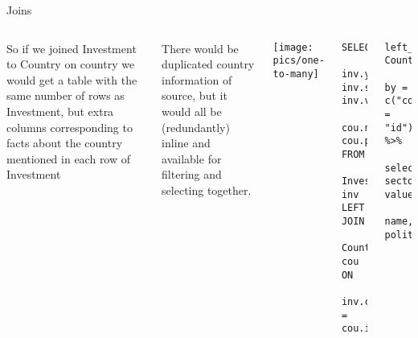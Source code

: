 \documentclass{hertieteaching}
\begin{document}
\begin{frame}[fragile]{Joins}

\begin{columns}[T,onlytextwidth]

So if we joined \textsf{Investment} to \textsf{Country} on \textsf{country} we would get a table with the same number of rows as \textsf{Investment}, but extra columns corresponding to facts about the country mentioned in each row of \textsf{Investment}

\bigskip
There would be duplicated country information of source, but it would all be (redundantly) inline and available for filtering and selecting together.

\bigskip
\centerline{\texttt{[image: pics/one-to-many]}}

\pause

{\small
\begin{verbatim}
SELECT 
  inv.year, inv.sector, inv.value, 
  cou.name, cou.politics
FROM 
  Investment inv
LEFT JOIN 
  Country cou
ON 
  inv.country_id = cou.id;
\end{verbatim}
}

\pause
\smallskip

{\small
\begin{verbatim}
left_join(Investment, Country, 
    by = c("country_id" = "id")) %>%
  select(year, sector, value, 
         name, politics)
\end{verbatim}
}

\end{columns}


\end{frame}
\end{document}
